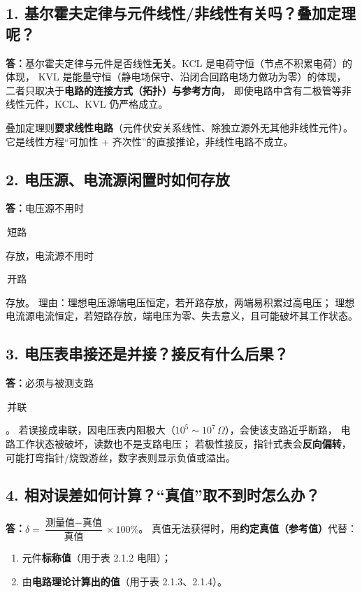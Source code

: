 \documentclass[UTF8,a4paper,10.5pt]{ctexart}
\newcommand{\key}[1]{\textbf{\color{acc}#1}}
\newcommand{\cw}[1]{\colorbox{soft}{\strut\,#1\,}}
\begin{document}
\subsection*{1. 基尔霍夫定律与元件线性/非线性有关吗？叠加定理呢？}
\key{答：}基尔霍夫定律与元件是否线性\key{无关}。KCL 是电荷守恒（节点不积累电荷）的体现，
KVL 是能量守恒（静电场保守、沿闭合回路电场力做功为零）的体现，
二者只取决于\key{电路的连接方式（拓扑）与参考方向}，
即使电路中含有二极管等非线性元件，KCL、KVL 仍严格成立。
\par
叠加定理则\key{要求线性电路}（元件伏安关系线性、除独立源外无其他非线性元件）。
它是线性方程“可加性 + 齐次性”的直接推论，非线性电路不成立。

\subsection*{2. 电压源、电流源闲置时如何存放}
\key{答：}电压源不用时\cw{短路}存放，电流源不用时\cw{开路}存放。
理由：理想电压源端电压恒定，若开路存放，两端易积累过高电压；
理想电流源电流恒定，若短路存放，端电压为零、失去意义，且可能破坏其工作状态。

\subsection*{3. 电压表串接还是并接？接反有什么后果？}
\key{答：}必须与被测支路\cw{并联}。
若误接成串联，因电压表内阻极大（$10^5\sim10^7\,\Omega$），会使该支路近乎断路，
电路工作状态被破坏，读数也不是支路电压；
若极性接反，指针式表会\key{反向偏转}，可能打弯指针/烧毁游丝，数字表则显示负值或溢出。

\subsection*{4. 相对误差如何计算？“真值”取不到时怎么办？}
\key{答：}$\delta=\dfrac{\text{测量值}-\text{真值}}{\text{真值}}\times100\%$。
真值无法获得时，用\key{约定真值（参考值）}代替：
\begin{enumerate}[label=\textcircled{\small\arabic*}]
  \item 元件\key{标称值}（用于表 2.1.2 电阻）；
  \item 由\key{电路理论计算出的值}（用于表 2.1.3、2.1.4）。
\end{enumerate}
\end{document}
